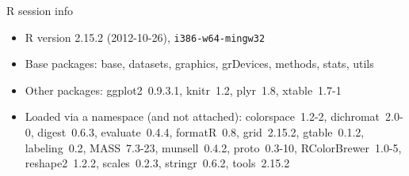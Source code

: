 \documentclass{scrartcl}\usepackage{graphicx, color}
\begin{document}
\newpage
R session info
\begin{itemize}\raggedright
  \item R version 2.15.2 (2012-10-26), \verb|i386-w64-mingw32|
  \item Base packages: base, datasets, graphics, grDevices,
    methods, stats, utils
  \item Other packages: ggplot2~0.9.3.1, knitr~1.2, plyr~1.8,
    xtable~1.7-1
  \item Loaded via a namespace (and not attached):
    colorspace~1.2-2, dichromat~2.0-0, digest~0.6.3,
    evaluate~0.4.4, formatR~0.8, grid~2.15.2, gtable~0.1.2,
    labeling~0.2, MASS~7.3-23, munsell~0.4.2, proto~0.3-10,
    RColorBrewer~1.0-5, reshape2~1.2.2, scales~0.2.3,
    stringr~0.6.2, tools~2.15.2
\end{itemize}
\end{document}
